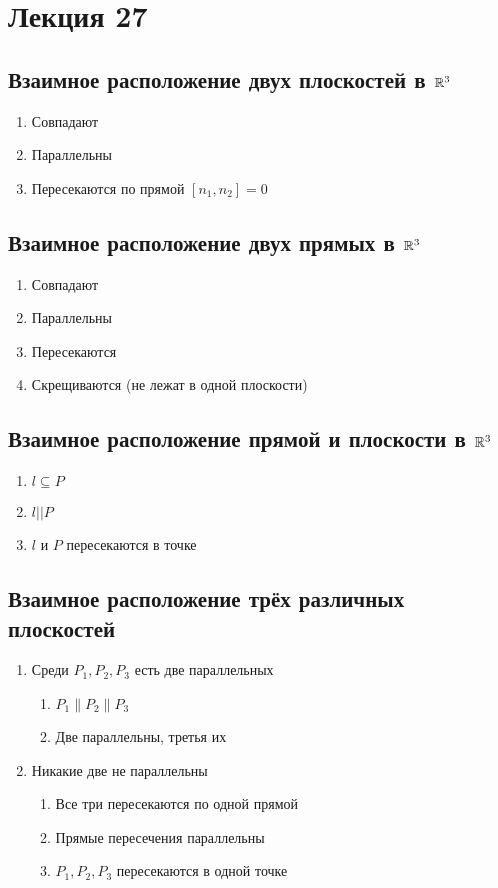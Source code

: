 \section*{Лекция 27}
%
\subsection*{Взаимное расположение двух плоскостей в $\mathbb{R}^3$}
%
\begin{enumerate}
  \item Совпадают
  \item Параллельны
  \item Пересекаются по прямой $[n_1, n_2] = 0$
\end{enumerate}
\subsection*{Взаимное расположение двух прямых в $\mathbb{R}^3$}
%
\begin{enumerate}
  \item Совпадают
  \item Параллельны
  \item Пересекаются
  \item Скрещиваются (не лежат в одной плоскости)
\end{enumerate}
\subsection*{Взаимное расположение прямой и плоскости в $\mathbb{R}^3$}
%
\begin{enumerate}
  \item $l \subseteq P$
  \item $l || P$
  \item $l$ и $P$ пересекаются в точке
\end{enumerate}
\subsection*{Взаимное расположение трёх различных плоскостей}
\begin{enumerate}
\item Среди $P_1, P_2, P_3$ есть две параллельных
  \begin{enumerate}
    \item $P_1 \parallel P_2 \parallel P_3$
    \item Две параллельны, третья их 
  \end{enumerate}
\item Никакие две не параллельны
  \begin{enumerate}
    \item Все три пересекаются по одной прямой
    \item Прямые пересечения параллельны
    \item $P_1, P_2, P_3$ пересекаются в одной точке
  \end{enumerate}
\end{enumerate}
